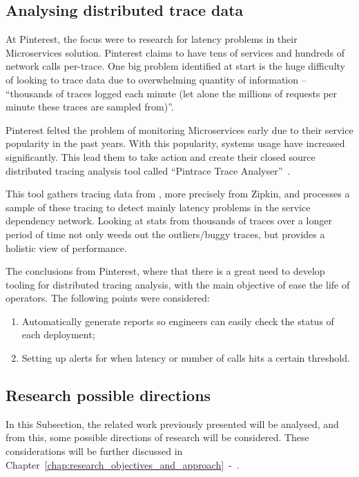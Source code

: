 \subsection{Analysing distributed trace data}
\label{subsec:analysing_distributed_trace_data}

At Pinterest, the focus were to research for latency problems in their Microservices solution. Pinterest claims to have tens of services and hundreds of network calls per-trace. One big problem identified at start is the huge difficulty of looking to trace data due to overwhelming quantity of information -- ``thousands of traces logged each minute (let alone the millions of requests per minute these traces are sampled from)''.

Pinterest felted the problem of monitoring Microservices early due to their service popularity in the past years. With this popularity, systems usage have increased significantly. This lead them to take action and create their closed source distributed tracing analysis tool called ``Pintrace Trace Analyser''~\cite{analysing_distributed_trace_data}.

This tool gathers tracing data from , more precisely from Zipkin, and processes a sample of these tracing to detect mainly latency problems in the service dependency network. Looking at stats from thousands of traces over a longer period of time not only weeds out the outliers/buggy traces, but provides a holistic view of performance.

The conclusions from Pinterest, where that there is a great need to develop tooling for distributed tracing analysis, with the main objective of ease the life of operators. The following points were considered:

\begin{enumerate}
    \item Automatically generate reports so engineers can easily check the status of each deployment;
    \item Setting up alerts for when latency or number of calls hits a certain threshold.
\end{enumerate}

\subsection{Research possible directions}
\label{subsec:research_possible_directions}

In this Subsection, the related work previously presented will be analysed, and from this, some possible directions of research will be considered. These considerations will be further discussed in Chapter~\ref{chap:research_objectives_and_approach}~-~.

